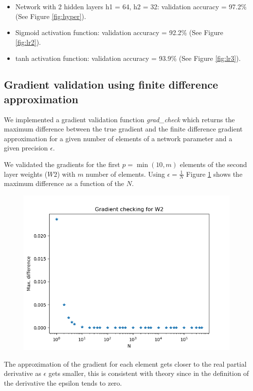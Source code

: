 \documentclass[a4paper]{article}
\begin{document}
\begin{enumerate}
\begin{itemize}

\item Network with 2 hidden layers h1 = 64, h2 = 32: validation accuracy = 97.2\% (See Figure \ref{fig:hyper}).

\item Sigmoid activation function: validation accuracy = 92.2\% (See Figure \ref{fig:lr2}).

\item tanh activation function: validation accuracy = 93.9\% (See Figure \ref{fig:lr3}).  
  
\end{itemize}

\subsection{Gradient validation using finite difference approximation}
We implemented a gradient validation function \emph{grad\_check} which returns the maximum difference between the true gradient and the finite difference gradient approximation for a given number of elements of a network parameter and a given precision $\epsilon$.

We validated the gradients for the first $p=\min(10,m)$ elements of the second layer weights ($W2$) with $m$ number of elements. Using $\epsilon=\frac{1}{N}$ Figure \ref{fig:grad_check} shows the maximum difference as a function of the $N$.

\begin{figure}
\centering
\includegraphics[width=1\textwidth]{grad_check}
\label{fig:grad_check}
\end{figure}

The approximation of the gradient for each element gets closer to the real partial derivative as $\epsilon$ gets smaller, this is consistent with theory since in the definition of the derivative the epsilon tends to zero. 

\end{enumerate}
\end{document}
